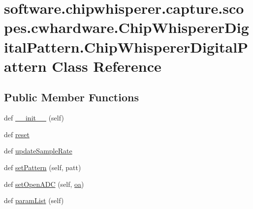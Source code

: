 \hypertarget{classsoftware_1_1chipwhisperer_1_1capture_1_1scopes_1_1cwhardware_1_1ChipWhispererDigitalPattern_1_1ChipWhispererDigitalPattern}{}\section{software.\+chipwhisperer.\+capture.\+scopes.\+cwhardware.\+Chip\+Whisperer\+Digital\+Pattern.\+Chip\+Whisperer\+Digital\+Pattern Class Reference}
\label{classsoftware_1_1chipwhisperer_1_1capture_1_1scopes_1_1cwhardware_1_1ChipWhispererDigitalPattern_1_1ChipWhispererDigitalPattern}
\subsection*{Public Member Functions}
\begin{DoxyCompactItemize}
\item 
def \hyperlink{classsoftware_1_1chipwhisperer_1_1capture_1_1scopes_1_1cwhardware_1_1ChipWhispererDigitalPattern_1_1ChipWhispererDigitalPattern_a642f159a42d37c7c4f9a03508cbe1dbc}{\+\_\+\+\_\+init\+\_\+\+\_\+} (self)
\item 
def \hyperlink{classsoftware_1_1chipwhisperer_1_1capture_1_1scopes_1_1cwhardware_1_1ChipWhispererDigitalPattern_1_1ChipWhispererDigitalPattern_a684fb499f39d3d240cbeec05237df12b}{reset}
\item 
def \hyperlink{classsoftware_1_1chipwhisperer_1_1capture_1_1scopes_1_1cwhardware_1_1ChipWhispererDigitalPattern_1_1ChipWhispererDigitalPattern_a09deba2625fee367ecd6202511be6289}{update\+Sample\+Rate}
\item 
def \hyperlink{classsoftware_1_1chipwhisperer_1_1capture_1_1scopes_1_1cwhardware_1_1ChipWhispererDigitalPattern_1_1ChipWhispererDigitalPattern_ae4e4f0adaa7233b3d750322f5bca55ee}{set\+Pattern} (self, patt)
\item 
def \hyperlink{classsoftware_1_1chipwhisperer_1_1capture_1_1scopes_1_1cwhardware_1_1ChipWhispererDigitalPattern_1_1ChipWhispererDigitalPattern_aa41093fac252da6b81875536f0f33253}{set\+Open\+A\+D\+C} (self, \hyperlink{classsoftware_1_1chipwhisperer_1_1capture_1_1scopes_1_1cwhardware_1_1ChipWhispererDigitalPattern_1_1ChipWhispererDigitalPattern_a56e9484cfa73593623eed4bb50635cee}{oa})
\item 
def \hyperlink{classsoftware_1_1chipwhisperer_1_1capture_1_1scopes_1_1cwhardware_1_1ChipWhispererDigitalPattern_1_1ChipWhispererDigitalPattern_a350f349c5dc751b2e37d3b2693de64db}{param\+List} (self)
\end{DoxyCompactItemize}
